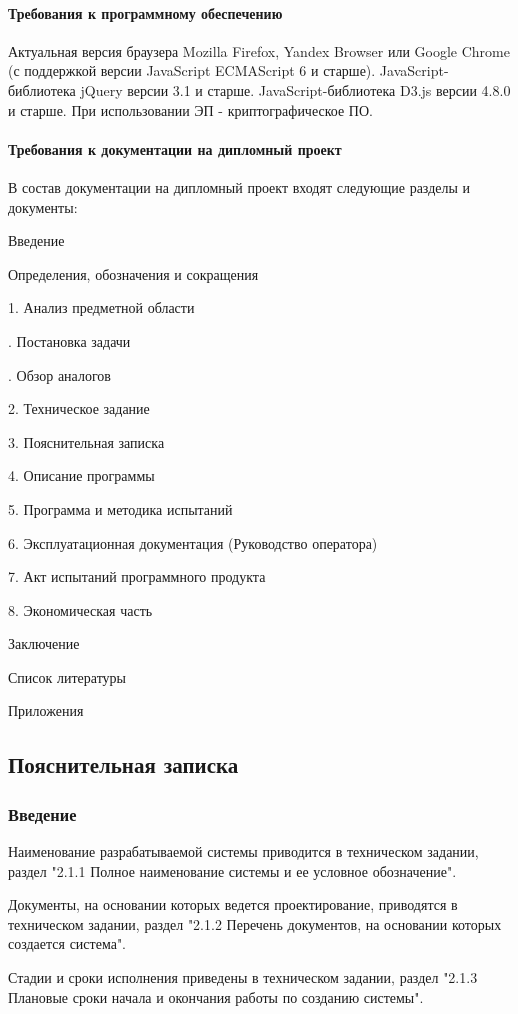 \documentclass[a4paper]{extarticle}
\numberwithin{equation}{section}
\begin{document}
\paragraph{Требования к программному обеспечению}
Актуальная версия браузера Mozilla Firefox, Yandex Browser или Google Chrome (с поддержкой версии JavaScript ECMAScript 6 и старше). JavaScript-библиотека jQuery версии 3.1 и старше. JavaScript-библиотека D3.js версии 4.8.0 и старше. При использовании ЭП - криптографическое ПО.

\paragraph{Требования к документации на дипломный проект}
В состав документации на дипломный проект входят следующие разделы и документы:\par
Введение\par
\qquad Определения, обозначения и сокращения\par
1.	Анализ предметной области\par
{}.	Постановка задачи\par
{}.	Обзор аналогов\par
2.	Техническое задание\par
3.	Пояснительная записка\par
4.	Описание программы\par
5.	Программа и методика испытаний\par
6.	Эксплуатационная документация (Руководство оператора)\par
7.	Акт испытаний программного продукта\par
8.	Экономическая часть\par
Заключение\par
Список литературы\par
Приложения\par

\subsection{Пояснительная записка}

\subsubsection*{Введение}
Наименование разрабатываемой системы приводится в техническом задании, раздел "2.1.1 Полное наименование системы и ее условное обозначение".\par
Документы, на основании которых ведется проектирование, приводятся в техническом задании, раздел "2.1.2 Перечень документов, на основании которых создается система".\par
Стадии и сроки исполнения приведены в техническом задании, раздел "2.1.3 Плановые сроки начала и окончания работы по созданию системы".
\end{document}
